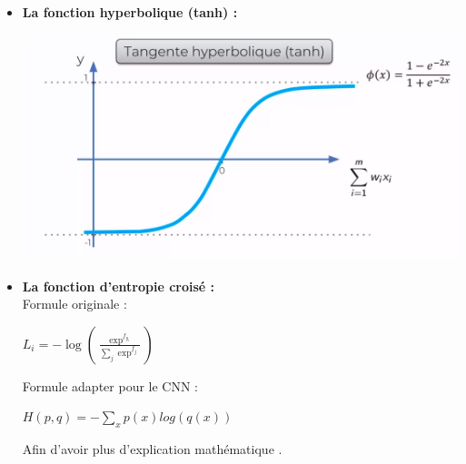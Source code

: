 \begin{itemize}
\begin{center}
\end{center}
\item \textbf{La fonction hyperbolique (tanh) :} 
\begin{center}
	\includegraphics[scale=0.2]{img22.png}
\end{center}
\newpage
\item \textbf{La fonction d’entropie croisé :}\\
Formule originale :
\begin{center}
	$L_{i} = -\log \left( \frac{\exp^{f_{y_{i}}}}{\sum_{j} \exp^{f_{j}}} \right)$
\end{center}
Formule adapter pour le CNN :
\begin{center}
	$H(p, q) = - \sum_{x} p(x)log(q(x))$
\end{center}
Afin d'avoir plus d'explication mathématique \cite{dipietro2016friendly}.
\end{itemize}

